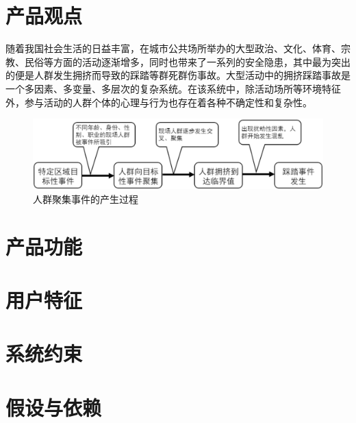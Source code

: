 \documentclass{ctexrep}
\begin{document}
\section{产品观点}
随着我国社会生活的日益丰富，在城市公共场所举办的大型政治、文化、体育、宗教、民俗等方面的活动逐渐增多，同时也带来了一系列的安全隐患，其中最为突出的便是人群发生拥挤而导致的踩踏等群死群伤事故。大型活动中的拥挤踩踏事故是一个多因素、多变量、多层次的复杂系统。在该系统中，除活动场所等环境特征外，参与活动的人群个体的心理与行为也存在着各种不确定性和复杂性。
\begin{figure}[H]
	\centering
	\includegraphics[scale=0.2]{img/stages.png}
	\caption{人群聚集事件的产生过程}
\end{figure}
\section{产品功能}
\section{用户特征}
\section{系统约束}
\section{假设与依赖}


\end{document}
